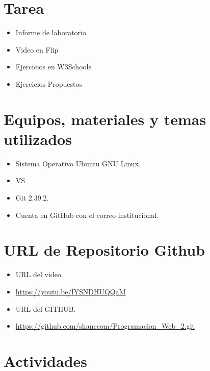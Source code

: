 \documentclass{article}
\begin{document}
	\section{Tarea}
	\begin{itemize}		
		\item Informe de laboratorio
            \item Video en Flip
            \item Ejercicios en W3Schools
		\item Ejercicios Propuestos
        
	\end{itemize}
		
	\section{Equipos, materiales y temas utilizados}
	\begin{itemize}
		\item Sistema Operativo Ubuntu GNU Linux.
		\item VS
		\item Git 2.39.2.
		\item Cuenta en GitHub con el correo institucional.
	\end{itemize}
    \clearpage
	\section{URL de Repositorio Github}
	\begin{itemize}
        \item URL del video.
		\item \url{https://youtu.be/lYSNDHUQQaM}
        \item URL del GITHUB.
		\item \url{https://github.com/shanccom/Programacion_Web_2.git}
	\end{itemize}
	
	\section{Actividades}
	
\end{document}
